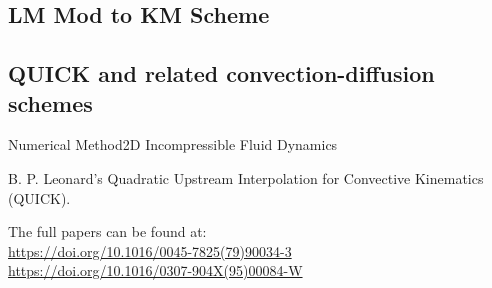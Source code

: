 \documentclass[aspectratio=169, sectionpages, codemintedoverleaf, bibref]{beamer}
\begin{document}

\subsection{LM Mod to KM Scheme}





%

\subsection{QUICK and related convection-diffusion schemes}

\begin{frame}{Numerical Method}{2D Incompressible Fluid Dynamics}
    
    \begin{block}{}
        \begin{center}
            B. P. Leonard's Quadratic Upstream Interpolation for Convective Kinematics (QUICK).
        \end{center}
    \end{block}

    \vspace{1em}
    
    \begin{center}
        \large{The full papers can be found at:} \\
        \url{https://doi.org/10.1016/0045-7825(79)90034-3}\\
        \url{https://doi.org/10.1016/0307-904X(95)00084-W}
                
        
    \end{center}
            
\end{frame}
\end{document}
